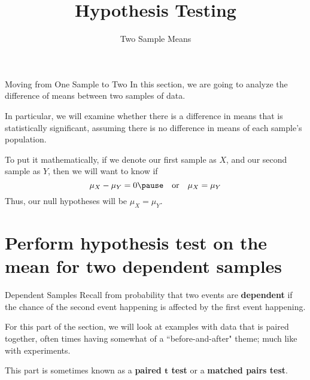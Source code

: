 \documentclass[t]{beamer}
\title{Hypothesis Testing}
\subtitle{Two Sample Means}
\author{}
\date{}
\begin{document}

\begin{frame} 
\maketitle
\end{frame}

\begin{frame}{Moving from One Sample to Two}
In this section, we are going to analyze the difference of means between two samples of data. \newline\\	\pause

In particular, we will examine whether there is a difference in means that is statistically significant, assuming there is no difference in means of each sample's population. \newline\\	\pause

To put it mathematically, if we denote our first sample as $X$, and our second sample as $Y$, then we will want to know if
\[\mu_X - \mu_Y = 0 \pause \quad \text{or} \quad \mu_X = \mu_Y\]
\pause
Thus, our null hypotheses will be $\mu_X = \mu_Y$.
\end{frame}

\section{Perform hypothesis test on the mean for two dependent samples}

\begin{frame}{Dependent Samples}
Recall from probability that two events are {\color{blue}\textbf{dependent}} if the chance of the second event happening is affected by the first event happening.	\newline\\	\pause

For this part of the section, we will look at examples with data that is paired together, often times having somewhat of a ``before-and-after" theme; much like with experiments.	\newline\\	\pause

This part is sometimes known as a {\color{blue}\textbf{paired $\bm{t}$ test}} or a {\color{blue}\textbf{matched pairs test}}.
\end{frame}
\end{document}
